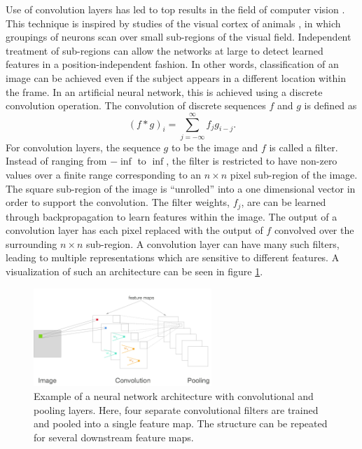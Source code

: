 Use of convolution layers has led to top results in the field of computer vision \cite{lecun2010convolutional,krizhevsky2012imagenet}.  This technique is inspired by studies of the visual cortex of animals  \cite{lecun2015deep}, in which groupings of neurons scan over small sub-regions of the visual field.  Independent treatment of sub-regions can allow the networks at large to detect learned features in a position-independent fashion.  In other words, classification of an image can be achieved even if the subject appears in a different location within the frame.  In an artificial neural network, this is achieved using a  discrete convolution operation.  The convolution of discrete sequences $f$ and $g$ is defined as
\begin{equation}
(f*g)_i = \sum_{j = -\infty}^{\infty} f_j g_{i-j}.
\end{equation}
For convolution layers, the sequence $g$ to be the image and $f$ is called a filter.  Instead of ranging from $-\inf$ to $\inf$, the filter is restricted to have non-zero values over a finite range corresponding to an $n \times n$ pixel sub-region of the image.  The square sub-region of the image is ``unrolled'' into a one dimensional vector in order to support the convolution.  The filter weights, $f_j$, are can be learned through backpropagation to learn features within the image.  The output of a convolution layer has each pixel replaced with the output of $f$ convolved over the surrounding $n\times n$ sub-region.  A convolution layer can have many such filters, leading to multiple representations which are sensitive to different features.  A visualization of such an architecture can be seen in figure \ref{convnet}.

\begin{figure}[t]
  \begin{center}
    \includegraphics[width=0.6\textwidth]{figures/figures/convnet.png}
  \end{center}
  \caption[Example of a convolutional network architecture]{Example of a neural network architecture with convolutional and pooling layers.  Here, four separate convolutional filters are trained and pooled into a single feature map.  The structure can be repeated for several downstream feature maps.}
  \label{convnet}
\end{figure}

